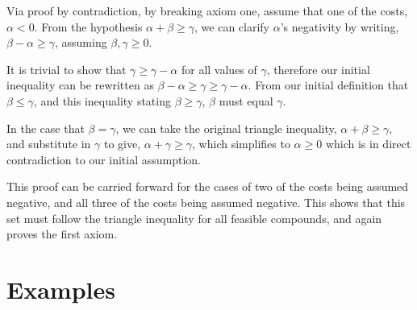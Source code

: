 \documentclass{article}
\begin{document}
Via proof by contradiction, by breaking axiom one, assume that one of the costs, $\alpha < 0$. From the hypothesis $\alpha + \beta \geq \gamma$, we can clarify $\alpha$'s negativity by writing,  $\beta - \alpha \geq \gamma$, assuming $\beta, \gamma \geq 0$.

It is trivial to show that $\gamma \geq \gamma - \alpha$ for all values of $\gamma$, therefore our initial inequality can be rewritten as $\beta - \alpha \geq \gamma \geq \gamma - \alpha$. From our initial definition that $\beta \leq \gamma$, and this inequality stating $\beta \geq \gamma$, $\beta$ must equal $\gamma$.

In the case that $\beta = \gamma$, we can take the original triangle inequality, $\alpha + \beta \geq \gamma$, and substitute in $\gamma$ to give, $\alpha + \gamma \geq \gamma$, which simplifies to $\alpha \geq 0$ which is in direct contradiction to our initial assumption.

This proof can be carried forward for the cases of two of the costs being assumed negative, and all three of the costs being assumed negative. This shows that this set must follow the triangle inequality for all feasible compounds, and again proves the first axiom.

\section{Examples}

\begin{figure}[h!]
   \centering
\end{figure}






\end{document}
